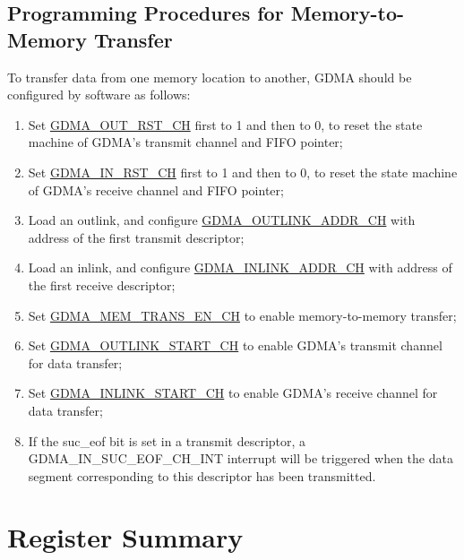 \documentclass[main\_\_EN.tex]{subfiles}
\begin{document}
\subsection{Programming Procedures for Memory-to-Memory Transfer}
To transfer data from one memory location to another, GDMA should be configured by software as follows:
\begin{enumerate}
    \item Set \hyperref[fielddesc:GDMAOUTRSTCHN]{GDMA\_OUT\_RST\_CH} first to 1 and then to 0, to reset the state machine of GDMA's transmit channel and FIFO pointer;
    \item Set \hyperref[fielddesc:GDMAINRSTCHN]{GDMA\_IN\_RST\_CH} first to 1 and then to 0, to reset the state machine of GDMA's receive channel and FIFO pointer;
    \item Load an outlink, and configure \hyperref[fielddesc:GDMAOUTLINKADDRCHN]{GDMA\_OUTLINK\_ADDR\_CH} with address of the first transmit descriptor;
    \item Load an inlink, and configure \hyperref[fielddesc:GDMAINLINKADDRCHN]{GDMA\_INLINK\_ADDR\_CH} with address of the first receive descriptor;
    \item Set \hyperref[fielddesc:GDMAMEMTRANSENCHN]{GDMA\_MEM\_TRANS\_EN\_CH} to enable memory-to-memory transfer;
    \item Set \hyperref[fielddesc:GDMAOUTLINKSTARTCHN]{GDMA\_OUTLINK\_START\_CH} to enable GDMA's transmit channel for data transfer;
    \item Set \hyperref[fielddesc:GDMAINLINKSTARTCHN]{GDMA\_INLINK\_START\_CH} to enable GDMA's receive channel for data transfer;
    \item If the suc\_eof bit is set in a transmit descriptor, a GDMA\_IN\_SUC\_EOF\_CH\_INT interrupt will be triggered when the data segment corresponding to this descriptor has been transmitted.
\end{enumerate}   




\clearpage
\section{Register Summary}
\label{sec:dma-reg-summ}
\hypertarget{dma-reg-summ}{}
\end{document}
